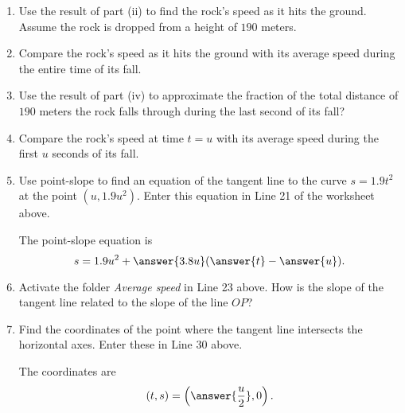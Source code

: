 \documentclass{ximera}
\begin{document}
\begin{exploration}
\begin{enumerate}
\begin{enumerate}
\item Use the result of part (ii) to find the rock's speed as it hits the ground. Assume the rock is dropped from a height of $190$ meters.

\item Compare the rock's speed as it hits the ground with its average speed during the entire time of its fall.

\item  Use the result of part (iv) to approximate the fraction of the total distance of $190$ meters the rock falls through during the last second of its fall? 

\item Compare the rock's speed at time $t=u$ with its average speed during the first $u$ seconds of its fall.

\item Use point-slope to find an equation of the tangent line to the curve $s=1.9t^2$ at the point $(u,1.9u^2)$. Enter this equation in Line 21 of the worksheet above.

The point-slope equation is
\[
     s = 1.9u^2 + \answer{3.8u} ( \answer{t} - \answer{u}) .
\]

\item Activate the folder \emph{Average speed} in Line 23 above. How is the slope of the tangent line related to the slope of the line $OP$?

\item Find the coordinates of the point where the tangent line intersects the horizontal axes. Enter these in Line 30 above.

The coordinates are
\[
  (t,s) = \left( \answer{\frac{u}{2}} , 0 \right) .
\]


\end{enumerate}


\end{enumerate}

\end{exploration}
\end{document}
